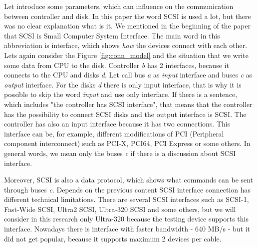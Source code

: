 Let introduce some parameters, which can influence on the communication between controller and disk. 
In this paper the word SCSI is used a lot, but there was no clear explanation what is it. We mentioned in the beginning of the paper that SCSI is Small Computer System Interface. The main word in this abbreviation is interface, which shows \emph{how} the devices connect with each other. Lets again consider the Figure \ref{fig:conn_model} and the situation that we write some data from CPU to the disk. Controller \emph{b} has 2 interfaces, because it connects to the CPU and disks \emph{d}. Let call bus \emph{a} as \emph{input} interface and buses \emph{c} as \emph{output} interface. For the disks \emph{d} there is only input interface, that is why it is possible to skip the word \emph{input} and use only interface. If there is a sentence, which includes "the controller has SCSI interface", that means that the controller has the possibility to connect SCSI disks and the output interface is SCSI. The controller has also an input interface because it has two connections. This interface can be, for example, different modifications of PCI (Peripheral component interconnect) such as PCI-X, PCI64, PCI Express or some others. In general words, we mean only the buses \emph{c} if there is a discussion about SCSI interface.

Moreover, SCSI is also a data protocol, which shows what commands can be sent through buses \emph{c}. Depends on the previous content SCSI interface connection has different technical limitations. There are several SCSI interfaces such as SCSI-1, Fast-Wide SCSI, Ultra2 SCSI, Ultra-320 SCSI and some others, but we will consider in this research only Ultra-320 because the testing device supports this interface. Nowadays there is interface with faster bandwidth - 640 MB/s - but it did not get popular, because it supports maximum 2 devices per cable.

